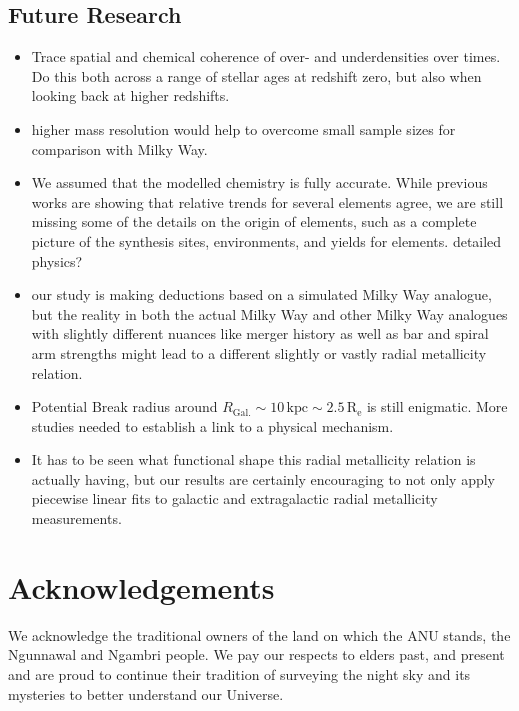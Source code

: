 \documentclass[fleqn,usenatbib]{mnras}
\begin{document}
\subsection{Future Research}

\begin{itemize}
    \item Trace spatial and chemical coherence of over- and underdensities over times. Do this both across a range of stellar ages at redshift zero, but also when looking back at higher redshifts.
    \item higher mass resolution would help to overcome small sample sizes for comparison with Milky Way.
    \item We assumed that the modelled chemistry is fully accurate. While previous works are showing that relative trends for several elements agree, we are still missing some of the details on the origin of elements, such as a complete picture of the synthesis sites, environments, and yields for elements. detailed physics?
    \item our study is making deductions based on a simulated Milky Way analogue, but the reality in both the actual Milky Way and other Milky Way analogues with slightly different nuances like merger history as well as bar and spiral arm strengths might lead to a different slightly or vastly radial metallicity relation.
    \item Potential Break radius around $R_\mathrm{Gal.} \sim 10\,\mathrm{kpc} \sim 2.5\,\mathrm{R_e}$ is still enigmatic. More studies needed to establish a link to a physical mechanism.
    \item It has to be seen what functional shape this radial metallicity relation is actually having, but our results are certainly encouraging to not only apply piecewise linear fits to galactic and extragalactic radial metallicity measurements.
\end{itemize}

\section*{Acknowledgements}

We acknowledge the traditional owners of the land on which the ANU stands, the Ngunnawal and Ngambri people. We pay our respects to elders past, and present and are proud to continue their tradition of surveying the night sky and its mysteries to better understand our Universe.
\end{document}
